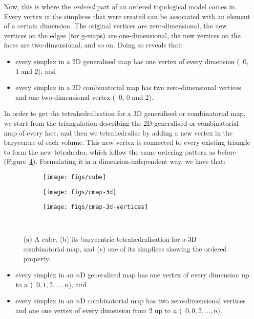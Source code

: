 Now, this is where the \emph{ordered} part of an ordered topological model comes in.
Every vertex in the simplices that were created can be associated with an element of a certain dimension.
The original vertices are zero-dimensional, the new vertices on the edges (for g-maps) are one-dimensional, the new vertices on the faces are two-dimensional, and so on.
Doing so reveals that:

\begin{itemize}
\item every simplex in a 2D generalised map has one vertex of every dimension (\ie\ \(0\), \(1\) and \(2\)), and
\item every simplex in a 2D combinatorial map has two zero-dimensional vertices and one two-di\-men\-sio\-nal vertex (\ie\ \(0\), \(0\) and \(2\)).
\end{itemize}

In order to get the tetrahedralisation for a 3D generalised or combinatorial map, we start from the triangulation describing the 2D generalised or combinatorial map of every face, and then we tetrahedralise by adding a new vertex in the barycentre of each volume.
This new vertex is connected to every existing triangle to form the new tetrahedra, which follow the same ordering pattern as before (Figure~\ref{fig:cmap-3d}).
Formulating it in a dimension-independent way, we have that:

\begin{figure}
\centering
\begin{subfigure}{0.33\linewidth}
\texttt{[image: figs/cube]}
\caption{}%
\label{subfig:cube}
\end{subfigure}%
\begin{subfigure}{0.33\linewidth}
\texttt{[image: figs/cmap-3d]}
\caption{}%
\label{subfig:cmap-3d}
\end{subfigure}%
\begin{subfigure}{0.33\linewidth}
\texttt{[image: figs/cmap-3d-vertices]}
\caption{}%
\label{subfig:cmap-3d-vertices}
\end{subfigure}\\
\caption{(a) A cube, (b) its barycentric tetrahedralisation for a 3D combinatorial map, and (c) one of its simplices showing the ordered property.}%
\label{fig:cmap-3d}
\end{figure}

\begin{itemize}
\item every simplex in an \(n\)D generalised map has one vertex of every dimension up to \(n\) (\ie\ \(0, 1, 2, \ldots, n\)), and
\item every simplex in an \(n\)D combinatorial map has two zero-dimensional vertices and one one vertex of every dimension from \(2\) up to \(n\) (\ie\ \(0, 0, 2, \ldots, n\)).
\end{itemize}

